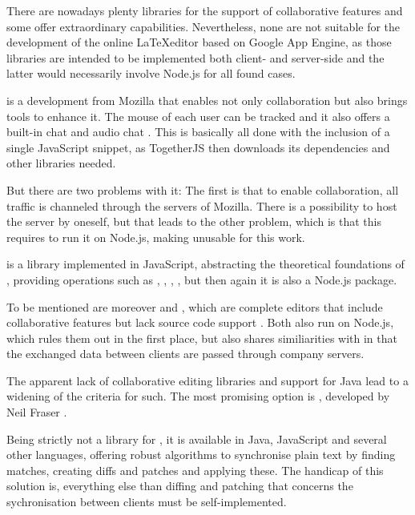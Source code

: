 There are nowadays plenty libraries for the support of collaborative features and some offer extraordinary capabilities. Nevertheless, none are not suitable for the development of the online \LaTeX editor based on Google App Engine, as those  libraries are intended to be implemented both client- and server-side and the latter would necessarily involve Node.js for all found cases.

\label{together-js}
 is a development from Mozilla that enables not only collaboration but also brings tools to enhance it. The mouse of each user can be tracked and it also offers a built-in chat and audio chat \cite{website:together-js}. This is basically all done with the inclusion of a single JavaScript snippet, as TogetherJS then downloads its dependencies and other libraries needed. 

But there are two problems with it: The first is that to enable collaboration, all traffic is channeled through the servers of Mozilla. There is a possibility to host the server by oneself, but that leads to the other problem, which is that this requires to run it on Node.js, making  unusable for this work.

 is a library implemented in JavaScript, abstracting the theoretical foundations of , providing operations such as , , , , but then again it is also a Node.js package. \cite{website:ot-js}

To be mentioned are moreover  and , which are complete editors that include collaborative features but lack source code support \cite{website:firepad} \cite{website:etherpad}. Both also run on Node.js, which rules them out in the first place, but  also shares similiarities with  in that the exchanged data between clients are passed through company servers.

The apparent lack of collaborative editing libraries and support for Java lead to a widening of the criteria for such. The most promising option is , developed by Neil Fraser \cite{website:diff-match-patch}. 

Being strictly not a library for , it is available in Java, JavaScript and several other languages, offering robust algorithms to synchronise plain text by finding \linebreak matches, creating diffs and patches and applying these. The handicap of this solution is, everything else than diffing and patching that concerns the sychronisation between clients must be self-implemented.


